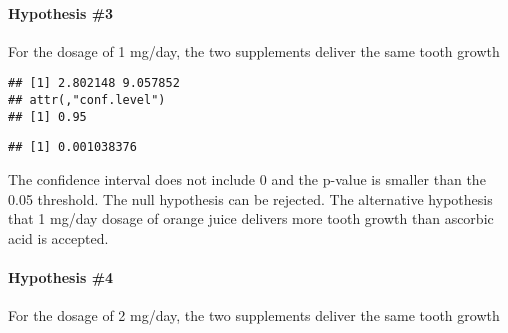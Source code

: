 \documentclass[
]{article}
\newenvironment{Shaded}{\begin{snugshade}}{\end{snugshade}}
\newcommand{\AttributeTok}[1]{\textcolor[rgb]{0.77,0.63,0.00}{#1}}
\newcommand{\DecValTok}[1]{\textcolor[rgb]{0.00,0.00,0.81}{#1}}
\newcommand{\FunctionTok}[1]{\textcolor[rgb]{0.00,0.00,0.00}{#1}}
\newcommand{\NormalTok}[1]{#1}
\newcommand{\OtherTok}[1]{\textcolor[rgb]{0.56,0.35,0.01}{#1}}
\newcommand{\SpecialCharTok}[1]{\textcolor[rgb]{0.00,0.00,0.00}{#1}}
\begin{document}
\hypertarget{hypothesis-3}{%
\paragraph{Hypothesis \#3}\label{hypothesis-3}}

For the dosage of 1 mg/day, the two supplements deliver the same tooth
growth

\begin{Shaded}
\end{Shaded}

\begin{verbatim}
## [1] 2.802148 9.057852
## attr(,"conf.level")
## [1] 0.95
\end{verbatim}

\begin{Shaded}
\end{Shaded}

\begin{verbatim}
## [1] 0.001038376
\end{verbatim}

The confidence interval does not include 0 and the p-value is smaller
than the 0.05 threshold. The null hypothesis can be rejected. The
alternative hypothesis that 1 mg/day dosage of orange juice delivers
more tooth growth than ascorbic acid is accepted.

\hypertarget{hypothesis-4}{%
\paragraph{Hypothesis \#4}\label{hypothesis-4}}

For the dosage of 2 mg/day, the two supplements deliver the same tooth
growth

\begin{Shaded}
\end{Shaded}
\end{document}
